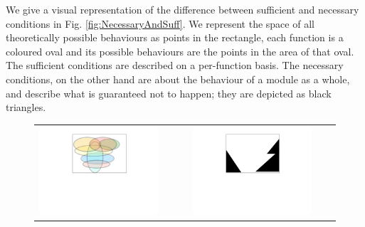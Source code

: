 We give a visual representation of the difference between sufficient and necessary conditions in 
Fig. \ref{fig:NecessaryAndSuff}. We
represent the space of all theoretically possible behaviours as points in the rectangle, 
each function is a coloured oval and its possible behaviours are the points in the area of that oval.  
The sufficient conditions are described on a per-function basis. 
The necessary conditions, on the other hand are about the behaviour of a module as a whole, 
and describe what is guaranteed not to happen;
they are depicted as black triangles.

  \begin{figure}[htb]
 \begin{tabular}{ccccc}
\begin{minipage}{0.25\textwidth}
 \includegraphics[width=\linewidth, trim=250  320 260 60,clip]{diagrams/Suff.pdf}
\end{minipage}
 & \ \ \ & 
\begin{minipage}{0.25\textwidth}
 \includegraphics[width=\linewidth, trim=250  320 260 60,clip]{diagrams/Nec.pdf}

\end{minipage}
\end{tabular}
\end{figure}
